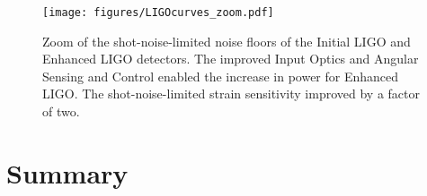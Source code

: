 \begin{figure}
\begin{centering}
\texttt{[image: figures/LIGOcurves\_zoom.pdf]}
\caption[Zoom of the shot-noise-limited noise floors of the Initial
LIGO and Enhanced LIGO detectors.]{Zoom of the shot-noise-limited
  noise floors of the Initial LIGO and Enhanced LIGO detectors. The
  improved Input Optics and Angular Sensing and Control enabled the
  increase in power for Enhanced LIGO. The shot-noise-limited strain
  sensitivity improved by a factor of two.}
\label{fig:LIGOcurves}
\end{centering}
\end{figure}


\section{Summary}

